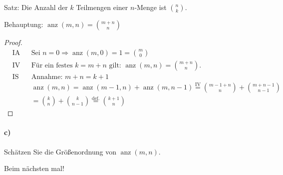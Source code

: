 \documentclass[a4paper]{scrartcl}
\DeclareMathOperator{\anz}{anz}
\begin{document}
\begin{center}
Satz: Die Anzahl der $ k $ Teilmengen einer $ n $-Menge ist $ \binom{n}{k} $.
\end{center} 

Behauptung: $ \anz(m, n) = \binom{m + n}{n} $

\begin{proof}
\begin{align*}
& \text{IA} &  & \text{Sei } n = 0 \Rightarrow \anz(m, 0) = 1 = \binom{m}{0}\\
& \text{IV} &  & \text{Für ein festes } k = m + n \text{ gilt: } \anz(m, n) = \binom{m + n}{n}.\\
& \text{IS} &  & \text{Annahme: } m + n = k + 1\\
& {} &  & \anz(m, n) = \anz(m - 1, n) + \anz(m, n - 1) \overset{\text{IV}}{=} \binom{m - 1 + n}{n} + \binom{m + n - 1}{n - 1}\\
& {} &  & = \binom{k}{n} + \binom{k}{n - 1} \overset{\text{def.}}{=} \binom{k + 1}{n}
\end{align*}
\end{proof}

\paragraph{c)} Schätzen Sie die Größenordnung von $ \anz(m, n) $.

Beim nächsten mal!
\end{document}
